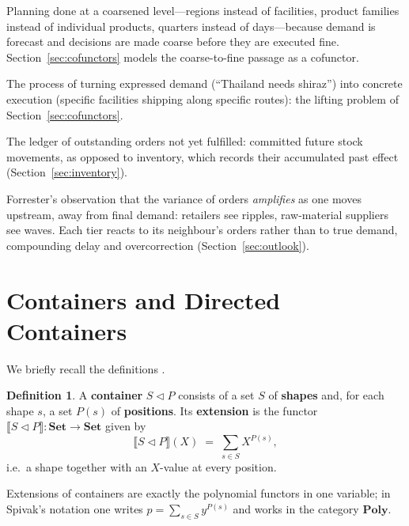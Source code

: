 \documentclass[11pt,a4paper]{article}
\newcommand{\Set}{\mathbf{Set}}
\newcommand{\Poly}{\mathbf{Poly}}
\newcommand{\cont}[2]{#1 \triangleleft #2}
\newcommand{\Ext}[1]{\llbracket #1 \rrbracket}
\theoremstyle{plain}
\theoremstyle{definition}
\newtheorem{definition}[theorem]{Definition}
\theoremstyle{remark}
\begin{document}
\begin{description}[nosep]
\item[Aggregate planning.] Planning done at a coarsened level---regions
  instead of facilities, product families instead of individual
  products, quarters
  instead of days---because demand is forecast and decisions are made
  coarse before they are executed fine. Section~\ref{sec:cofunctors} models the
  coarse-to-fine passage as a cofunctor.

\item[Demand fulfilment.] The process of turning expressed demand
  (``Thailand needs shiraz'') into concrete execution (specific
  facilities shipping along specific routes): the lifting problem of
  Section~\ref{sec:cofunctors}.

\item[Order book.] The ledger of outstanding orders not yet fulfilled:
  committed future stock movements, as opposed to inventory, which
  records their accumulated past effect (Section~\ref{sec:inventory}).

\item[Bullwhip effect.] Forrester's observation that the variance of
  orders \emph{amplifies} as one moves upstream, away from final
  demand: retailers see ripples, raw-material suppliers see waves.
  Each tier reacts to its neighbour's orders rather than to true
  demand, compounding delay and overcorrection (Section~\ref{sec:outlook}).
\end{description}

\section{Containers and Directed Containers}\label{sec:dcont}

We briefly recall the definitions
\cite{abbott-altenkirch-ghani, ahman-chapman-uustalu}.

\begin{definition}
A \textbf{container} $\cont{S}{P}$ consists of a set $S$ of
\textbf{shapes} and, for each shape $s$, a set $P(s)$ of
\textbf{positions}. Its \textbf{extension} is the functor
$\Ext{\cont{S}{P}} : \Set \to \Set$ given by
\[
\Ext{\cont{S}{P}}(X) \;=\; \sum_{s \in S} X^{P(s)},
\]
i.e.\ a shape together with an $X$-value at every position.
\end{definition}

Extensions of containers are exactly the polynomial functors in one
variable; in Spivak's notation \cite{spivak-poly, niu-spivak} one
writes $p = \sum_{s \in S} y^{P(s)}$ and works in the category $\Poly$.
\end{document}
